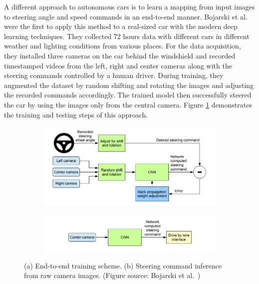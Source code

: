 A different approach to autonomous cars is to learn a mapping from input images
to steering angle and speed commands in an end-to-end manner. Bojarski et al.\
\cite{Bojarski2016EndTE} were the first to apply this method to a real-sized
car with the modern deep learning techniques. They collected 72 hours data with
different cars in different weather and lighting conditions from various
places. For the data acquisition, they installed three cameras on the car
behind the windshield and recorded timestamped videos from the left, right and
center cameras along with the steering commands controlled by a human driver.
During training, they augmented the dataset by random shifting and rotating the
images and adjusting the recorded commands accordingly. The trained model then
successfully steered the car by using the images only from the central camera.
Figure \ref{figure:end-to-end-network} demonstrates the training and testing
steps of this approach.

\begin{figure}[h]
  \centering
  \begin{subfigure}[b]{1.0\linewidth}
    \includegraphics[width=\linewidth]{figures/end-to-end-training.png}
    \caption{}
  \end{subfigure}
  \begin{subfigure}[b]{1.0\linewidth}
    \includegraphics[width=\linewidth]{figures/end-to-end-inference.png}
    \caption{}
  \end{subfigure}
  \caption[End-to-end training and inference]{(a) End-to-end training scheme.
    (b) Steering command inference from raw camera images. (Figure source:
    Bojarski et al.\ \cite{Bojarski2016EndTE})}
  \label{figure:end-to-end-network}
\end{figure}

